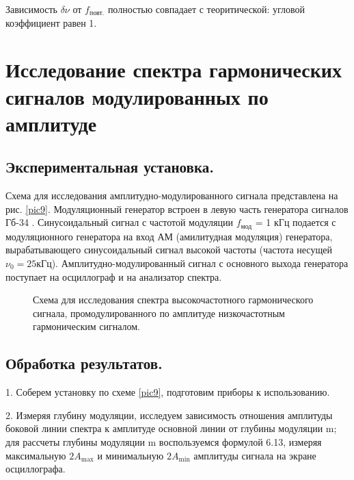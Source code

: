 \documentclass[a4paper,12pt]{article} %
\begin{document}
Зависимость $\delta \nu$ от $f_\text{повт.}$ полностью совпадает с теоритической: угловой коэффициент равен 1.

\section{Исследование спектра гармонических сигналов модулированных по амплитуде}

\subsection{Экспериментальная установка.}

Схема для исследования амплитудно-модулированного сигнала представлена на рис. \eqref{pic9}. Модуляционный генератор встроен в левую часть генератора сигналов Гб-34 . Синусоидальный сигнал с частотой модуляции $f_\text{мод}$ = 1 кГц подается с модуляционного генератора на вход АМ (амилитудная модуляция) генератора, вырабатывающего синусоидальный сигнал высокой частоты (частота несущей $ \nu_0 = 25 \text{кГц}$). Амплитудно-модулированный сигнал с основного выхода генератора поступает на осциллограф и на анализатор спектра.

\begin{figure}[H]\label{pic9}
 	\caption{Схема для исследования спектра высокочастотного гармонического сигнала, промодулированного по амплитуде низкочастотным гармоническим сигналом.}
\end{figure}

\subsection{Обработка результатов.}

1. Соберем установку по схеме \eqref{pic9}, подготовим приборы к использованию.

2. Измеряя глубину модуляции, исследуем зависимость отношения амплитуды боковой линии спектра к амплитуде основной линии от глубины модуляции m; для рассчеты глубины модуляции m воспользуемся формулой 6.13, измеряя максимальную $2A_\text{max}$ и минимальную $2A_\text{min}$ амплитуды сигнала на экране осциллографа.
\end{document}
